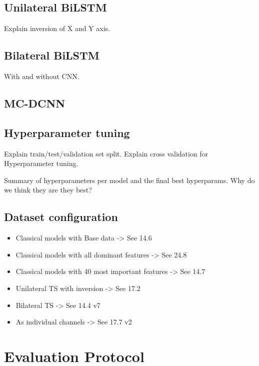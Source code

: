 \subsection{Unilateral BiLSTM}\label{subsec:method-unilat-bilstm}
Explain inversion of X and Y axis.
\subsection{Bilateral BiLSTM}\label{subsec:method-bilat-bilstm}
With and without CNN.
\subsection{MC-DCNN}\label{subsec:method-mc-dcnn}

\subsection{Hyperparameter tuning}\label{subsec:method-hyperparam-tuning}
Explain train/test/validation set split.
Explain cross validation for Hyperparameter tuning.

Summary of hyperparameters per model and the final best hyperparams.
Why do we think they are they best?

\subsection{Dataset configuration}\label{subsec:method-data-config}
\begin{itemize}
    \item Classical models with Base data -> See 14.6
    \item Classical models with all dominant features ->  See 24.8
    \item Classical models with 40 most important features -> See 14.7
    \item Unilateral TS with inversion -> See 17.2
    \item Bilateral TS -> See 14.4 v7
    \item As individual channels -> See 17.7 v2
\end{itemize}


\section{Evaluation Protocol}\label{sec:method-evaluation-protocol}

